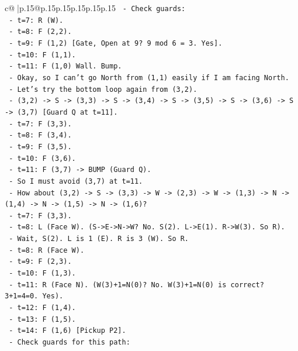 \documentclass{article}
\begin{document}
{\begin{supertabular}{c@{$\;$}|p{.15\linewidth}@{}p{.15\linewidth}p{.15\linewidth}p{.15\linewidth}p{.15\linewidth}p{.15\linewidth}}
{{{\texttt{      {-} Check guards:} \\
\texttt{        {-} t=7: R (W).} \\
\texttt{        {-} t=8: F (2,2).} \\
\texttt{        {-} t=9: F (1,2) {[}Gate, Open at 9? 9 mod 6 = 3. Yes{]}.} \\
\texttt{        {-} t=10: F (1,1).} \\
\texttt{        {-} t=11: F (1,0) Wall. Bump.} \\
\texttt{      {-} Okay, so I can't go North from (1,1) easily if I am facing North.} \\
\texttt{      {-} Let's try the bottom loop again from (3,2).} \\
\texttt{      {-} (3,2) {-}> S {-}> (3,3) {-}> S {-}> (3,4) {-}> S {-}> (3,5) {-}> S {-}> (3,6) {-}> S {-}> (3,7) {[}Guard Q at t=11{]}.} \\
\texttt{        {-} t=7: F (3,3).} \\
\texttt{        {-} t=8: F (3,4).} \\
\texttt{        {-} t=9: F (3,5).} \\
\texttt{        {-} t=10: F (3,6).} \\
\texttt{        {-} t=11: F (3,7) {-}> BUMP (Guard Q).} \\
\texttt{      {-} So I must avoid (3,7) at t=11.} \\
\texttt{      {-} How about (3,2) {-}> S {-}> (3,3) {-}> W {-}> (2,3) {-}> W {-}> (1,3) {-}> N {-}> (1,4) {-}> N {-}> (1,5) {-}> N {-}> (1,6)?} \\
\texttt{        {-} t=7: F (3,3).} \\
\texttt{        {-} t=8: L (Face W). (S{-}>E{-}>N{-}>W? No. S(2). L{-}>E(1). R{-}>W(3). So R).} \\
\texttt{          {-} Wait, S(2). L is 1 (E). R is 3 (W). So R.} \\
\texttt{          {-} t=8: R (Face W).} \\
\texttt{        {-} t=9: F (2,3).} \\
\texttt{        {-} t=10: F (1,3).} \\
\texttt{        {-} t=11: R (Face N). (W(3)+1=N(0)? No. W(3)+1=N(0) is correct? 3+1=4=0. Yes).} \\
\texttt{        {-} t=12: F (1,4).} \\
\texttt{        {-} t=13: F (1,5).} \\
\texttt{        {-} t=14: F (1,6) {[}Pickup P2{]}.} \\
\texttt{      {-} Check guards for this path:} \\
}}}
\end{supertabular}}
\end{document}
